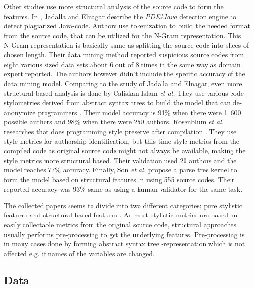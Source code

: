 \documentclass[english]{tktltiki2}
\theoremstyle{definition}
\theoremstyle{remark}
\begin{document}
Other studies use more structural analysis of the source code to form the features. In \cite{jadalla2008pde4java}, Jadalla and Elnagar describe the \textit{PDE4Java} detection engine to detect plagiarized Java-code. Authors use tokenization to build the needed format from the source code, that can be utilized for the N-Gram representation. This N-Gram representation is basically same as splitting the source code into slices of chosen length. Their data mining method reported suspicious source codes from eight various sized data sets about 6 out of 8 times in the same way as domain expert reported. The authors however didn't include the specific accuracy of the data mining model. Comparing to the study of Jadalla and Elnagar, even more structural-based analysis is done by Caliskan-Islam \textit{et al.} They use various code stylometries derived from abstract syntax trees to build the model that can de-anonymize programmers \cite{caliskan2015anonymizing}. Their model accuracy is 94\% when there were 1\ 600 possible authors and 98\% when there were 250 authors. Rosenblum \textit{et al.} researches that does programming style preserve after compilation \cite{rosenblum2011wrote}. They use style metrics for authorship identification, but this time style metrics from the compiled code as original source code might not always be available, making the style metrics more structural based. Their validation used 20 authors and the model reaches 77\% accuracy. Finally, Son \textit{et al.} propose a parse tree kernel to form the model based on structural features in \cite{Son:2013:APS:2508269.2508323} using 555 source codes. Their reported accuracy was 93\% same as using a human validator for the same task.

The collected papers seems to divide into two different categories: pure stylistic features \cite{bandara2011machine, lange2007using, kothari2007probabilistic, Elenbogen:2008:DOS:1295109.1295123} and structural based features \cite{jadalla2008pde4java,caliskan2015anonymizing,rosenblum2011wrote, Son:2013:APS:2508269.2508323}. As most stylistic metrics are based on easily collectable metrics from the original source code, structural approaches usually performs pre-processing to get the underlying features. Pre-processing is in many cases done by forming abstract syntax tree -representation which is not affected e.g. if names of the variables are changed.  


\subsection{Data}
\end{document}
